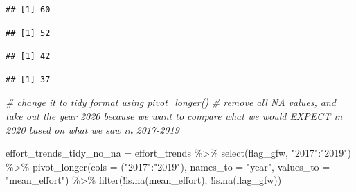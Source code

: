 \documentclass[
]{article}
\newenvironment{Shaded}{\begin{snugshade}}{\end{snugshade}}
\newcommand{\AttributeTok}[1]{\textcolor[rgb]{0.77,0.63,0.00}{#1}}
\newcommand{\CommentTok}[1]{\textcolor[rgb]{0.56,0.35,0.01}{\textit{#1}}}
\newcommand{\FunctionTok}[1]{\textcolor[rgb]{0.00,0.00,0.00}{#1}}
\newcommand{\NormalTok}[1]{#1}
\newcommand{\OtherTok}[1]{\textcolor[rgb]{0.56,0.35,0.01}{#1}}
\newcommand{\SpecialCharTok}[1]{\textcolor[rgb]{0.00,0.00,0.00}{#1}}
\newcommand{\StringTok}[1]{\textcolor[rgb]{0.31,0.60,0.02}{#1}}
\begin{document}
\begin{verbatim}
## [1] 60
\end{verbatim}

\begin{Shaded}
\end{Shaded}

\begin{verbatim}
## [1] 52
\end{verbatim}

\begin{Shaded}
\end{Shaded}

\begin{verbatim}
## [1] 42
\end{verbatim}

\begin{Shaded}
\end{Shaded}

\begin{verbatim}
## [1] 37
\end{verbatim}

\begin{Shaded}
\begin{Highlighting}[]
\CommentTok{\# change it to tidy format using pivot\_longer()}
\CommentTok{\# remove all NA values, and take out the year 2020 because we want to compare what we would EXPECT in 2020 based on what we saw in 2017{-}2019}

\NormalTok{effort\_trends\_tidy\_no\_na }\OtherTok{=}\NormalTok{ effort\_trends }\SpecialCharTok{\%\textgreater{}\%}
  \FunctionTok{select}\NormalTok{(flag\_gfw, }\StringTok{"2017"}\SpecialCharTok{:}\StringTok{"2019"}\NormalTok{) }\SpecialCharTok{\%\textgreater{}\%} 
  \FunctionTok{pivot\_longer}\NormalTok{(}\AttributeTok{cols =}\NormalTok{ (}\StringTok{"2017"}\SpecialCharTok{:}\StringTok{"2019"}\NormalTok{),}
               \AttributeTok{names\_to =} \StringTok{"year"}\NormalTok{,}
               \AttributeTok{values\_to =} \StringTok{"mean\_effort"}\NormalTok{) }\SpecialCharTok{\%\textgreater{}\%} 
  \FunctionTok{filter}\NormalTok{(}\SpecialCharTok{!}\FunctionTok{is.na}\NormalTok{(mean\_effort),}
         \SpecialCharTok{!}\FunctionTok{is.na}\NormalTok{(flag\_gfw))}
\end{Highlighting}
\end{Shaded}
\end{document}
